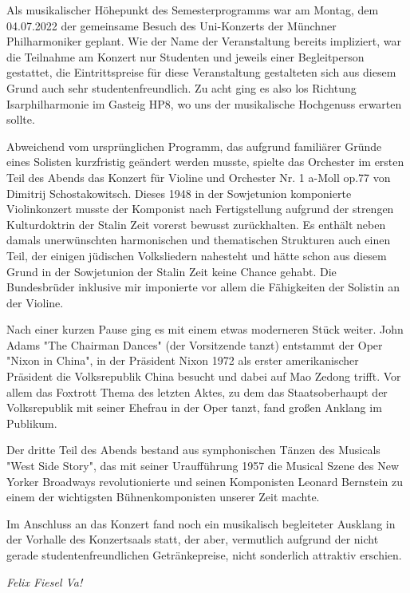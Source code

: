 \begin{multicols}{2}	
Als musikalischer Höhepunkt des Semesterprogramms war am Montag, dem 04.07.2022 der gemeinsame Besuch des Uni-Konzerts der Münchner Philharmoniker geplant. Wie der Name der Veranstaltung bereits impliziert, war die Teilnahme am Konzert nur Studenten und jeweils einer Begleitperson gestattet, die Eintrittspreise für diese Veranstaltung gestalteten sich aus diesem Grund auch sehr studentenfreundlich.
Zu acht ging es also los Richtung Isarphilharmonie im Gasteig HP8, wo uns der musikalische Hochgenuss erwarten sollte. 

Abweichend vom ursprünglichen Programm, das aufgrund familiärer Gründe eines Solisten kurzfristig geändert werden musste, spielte das Orchester im ersten Teil des Abends das Konzert für Violine und Orchester Nr. 1 a-Moll op.77 von Dimitrij Schostakowitsch. Dieses 1948 in der Sowjetunion komponierte Violinkonzert musste der Komponist nach Fertigstellung aufgrund der strengen Kulturdoktrin der Stalin Zeit vorerst bewusst zurückhalten. Es enthält neben damals unerwünschten harmonischen und thematischen Strukturen auch einen Teil, der einigen jüdischen Volksliedern nahesteht und hätte schon aus diesem Grund in der Sowjetunion der Stalin Zeit keine Chance gehabt. Die Bundesbrüder inklusive mir imponierte vor allem die Fähigkeiten der Solistin an der Violine.

Nach einer kurzen Pause ging es mit einem etwas moderneren Stück weiter. John Adams "The Chairman Dances" (der Vorsitzende tanzt) entstammt der Oper "Nixon in China", in der Präsident Nixon 1972 als erster amerikanischer Präsident die Volksrepublik China besucht und dabei auf Mao Zedong trifft. Vor allem das Foxtrott Thema des letzten Aktes, zu dem das Staatsoberhaupt der Volksrepublik mit seiner Ehefrau in der Oper tanzt, fand großen Anklang im Publikum. 

Der dritte Teil des Abends bestand aus symphonischen Tänzen des Musicals "West Side Story", das mit seiner Uraufführung 1957 die Musical Szene des New Yorker Broadways revolutionierte und seinen Komponisten Leonard Bernstein zu einem der wichtigsten Bühnenkomponisten unserer Zeit machte. 

Im Anschluss an das Konzert fand noch ein musikalisch begleiteter Ausklang in der Vorhalle des Konzertsaals statt, der aber, vermutlich aufgrund der nicht gerade studentenfreundlichen Getränkepreise, nicht sonderlich attraktiv erschien.


	\begin{flushright}
		\hfill\emph{Felix Fiesel Va!}
	\end{flushright}
\end{multicols}
%


